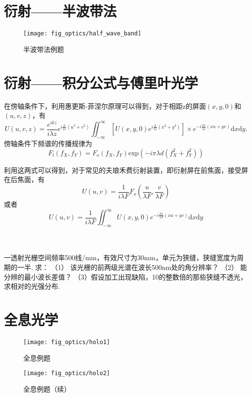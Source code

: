 \documentclass[a4paper]{article}
\begin{document}
	\section{衍射——半波带法}
	\begin{framed}
		\begin{figure}[H]
			\centering
			\texttt{[image: fig\_optics/half\_wave\_band]}
			\caption{半波带法例题}
			\label{fig:halfwaveband}
		\end{figure}
	\end{framed}
	
	\section{衍射——积分公式与傅里叶光学}
	在傍轴条件下，利用惠更斯-菲涅尔原理可以得到，对于相距z的屏面$(x,y,0)$和$(u,v,z)$，有$$U(u,v,z)=\frac{e^{ikz} }{i\lambda z}e^{i\frac{k}{2z}(u^2+v^2)}\iint_{-\infty}^{\infty} [U(x,y,0)e^{i\frac{k}{2z}(x^2+y^2)}]\times e^{-i\frac{2\pi}{\lambda z}(xu+yv)}\mathrm{d}x\mathrm{d}y.$$
	傍轴条件下频谱的传播规律为$$F_l(f_X,f_Y)=F_o(f_X,f_Y)\mathrm{exp}(-i\pi \lambda d (f_X^2+f_Y^2))$$
	
	利用这两式可以得到，对于常见的夫琅禾费衍射装置，即衍射屏在前焦面，接受屏在后焦面，有$$U(u,v)=\frac{1}{i\lambda F}F_o(\frac{u}{\lambda F},\frac{v}{\lambda F})$$或者$$U(u,v)=\frac{1}{i\lambda F} \iint_{-\infty}^{\infty} U(x,y,0)e^{-i\frac{2\pi}{\lambda F}(xu+yv)}\mathrm{d}x\mathrm{d}y$$
	\\
	\\
	
	\begin{framed}
		一透射光栅空间频率500线/mm，有效尺寸为30mm，单元为狭缝，狭缝宽度为周期的一半. 求：
		（1） 该光栅的前两级光谱在波长500nm处的角分辨率？
		（2） 能分辨的最小波长差值？
		（3）假设加工出现缺陷，10的整数倍的那些狭缝不透光，求相对的光强分布. 
	\end{framed}
	
	\section{全息光学}
	\begin{framed}
		\begin{figure}[H]
			\centering
			\texttt{[image: fig\_optics/holo1]}
			\caption{全息例题}
			\label{fig:holo1}
		\end{figure}
		\begin{figure}[H]
			\centering
			\texttt{[image: fig\_optics/holo2]}
			\caption{全息例题（续）}
			\label{fig:holo2}
		\end{figure}
	\end{framed}
	
\end{document}
